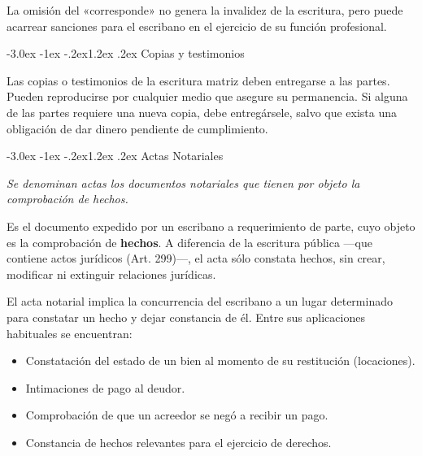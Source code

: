 \documentclass[12pt,oneside]{book}
\makeatletter
\renewcommand\section{\@startsection{section}{1}{\z@}%
  {-3.0ex \@plus -1ex \@minus -.2ex}{1.2ex \@plus .2ex}%
  {\normalfont\large\bfseries\color{acento}}}
\makeatother
\begin{document}
La omisión del «corresponde» no genera la invalidez de la escritura, pero puede acarrear sanciones para el escribano en el ejercicio de su función profesional.

\section{Copias y testimonios}

Las copias o testimonios de la escritura matriz deben entregarse a las partes. Pueden reproducirse por cualquier medio que asegure su permanencia. Si alguna de las partes requiere una nueva copia, debe entregársele, salvo que exista una obligación de dar dinero pendiente de cumplimiento.


\section{Actas Notariales}

\begin{regla}
\textit{Se denominan actas los documentos notariales que tienen por objeto la comprobación de hechos.}
\end{regla}

\begin{definicion}
Es el documento expedido por un escribano a requerimiento de parte, cuyo objeto es la comprobación de \textbf{hechos}. A diferencia de la escritura pública ---que contiene actos jurídicos (Art. 299)---, el acta sólo constata hechos, sin crear, modificar ni extinguir relaciones jurídicas.
\end{definicion}

El acta notarial implica la concurrencia del escribano a un lugar determinado para constatar un hecho y dejar constancia de él. Entre sus aplicaciones habituales se encuentran:

\begin{itemize}
    \item Constatación del estado de un bien al momento de su restitución (locaciones).
    \item Intimaciones de pago al deudor.
    \item Comprobación de que un acreedor se negó a recibir un pago.
    \item Constancia de hechos relevantes para el ejercicio de derechos.
\end{itemize}
\end{document}
